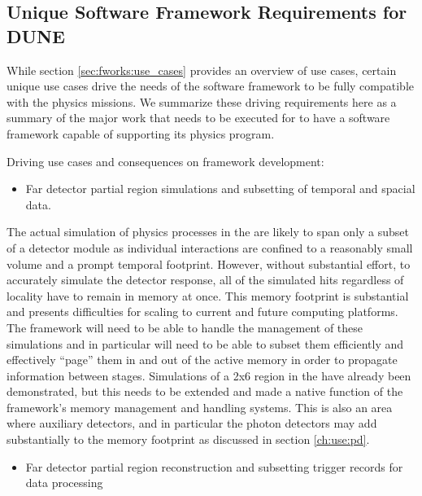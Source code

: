 \documentclass[../main-v1.tex]{subfiles}
\begin{document}
\subsection{Unique Software Framework Requirements for DUNE}
\label{sec:fworks:urgent}

While section \ref{sec:fworks:use_cases} provides an overview of use cases, certain unique use cases drive the needs of the  software framework to be fully compatible with the physics missions.   We summarize these driving requirements here as a summary of the major work that needs to be executed for  to have a software framework capable of supporting its physics program.


Driving use cases and consequences on framework development:


\begin{itemize}
\item Far detector partial region simulations and subsetting of temporal and spacial data.
\end{itemize}

The actual simulation of physics processes in the  are likely to span only a subset of a detector module as individual interactions are confined to a reasonably small volume and a prompt temporal footprint.  However, without substantial effort, to accurately simulate the detector response, all of the simulated hits regardless of locality have to remain in memory at once.  This memory footprint is substantial and presents difficulties for scaling to current and future computing platforms.  The framework will need to be able to handle the management of these simulations and in particular will need to be able to subset them efficiently and effectively ``page'' them in and out of the active memory in order to propagate information between stages.  Simulations of a 2x6  region in the  have already been demonstrated, but this needs to be extended and made a native function of the framework's memory management and handling systems.  This is also an area where auxiliary detectors, and in particular the photon detectors may add substantially to the memory footprint as discussed in section \ref{ch:use:pd}. 


\begin{itemize}
\item Far detector partial region reconstruction and subsetting trigger records for data processing
\end{itemize}
\end{document}
